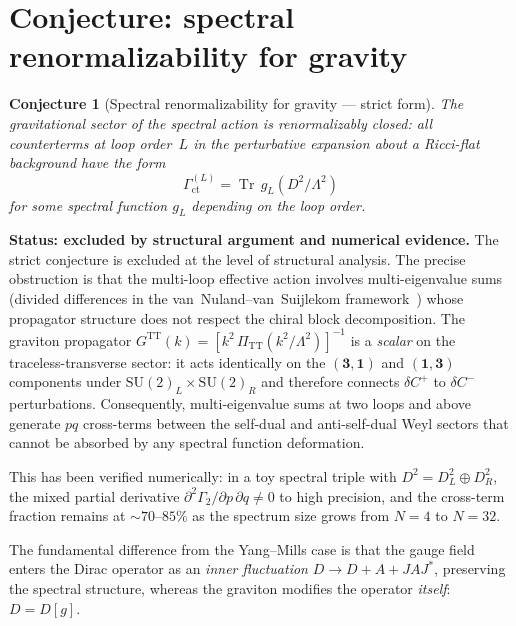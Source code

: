 \documentclass[12pt,a4paper]{article}
\newtheorem{conjecture}[theorem]{Conjecture}
\theoremstyle{definition}
\theoremstyle{remark}
\newcommand{\Tr}{\operatorname{Tr}}
\newcommand{\Lam}{\Lambda}
\begin{document}
\section{Conjecture: spectral renormalizability for gravity}
\label{sec:conjecture}

\begin{conjecture}[Spectral renormalizability for gravity --- strict form]
\label{conj:spectral}
The gravitational sector of the spectral action is \emph{renormalizably
closed}: all counterterms at loop order~$L$ in the perturbative expansion
about a Ricci-flat background have the form
\begin{equation}\label{eq:conj}
  \Gamma_{\mathrm{ct}}^{(L)} = \Tr\,g_L(D^2/\Lam^2)
\end{equation}
for some spectral function $g_L$ depending on the loop order.
\end{conjecture}

\noindent\textbf{Status: excluded by structural argument and numerical evidence.}
The strict conjecture is excluded at the level of structural analysis.  The precise
obstruction is that the multi-loop effective action involves multi-eigenvalue
sums (divided differences in the van~Nuland--van~Suijlekom
framework~\cite{vanNuland:2021}) whose propagator structure does not respect
the chiral block decomposition.  The graviton propagator
$G^{\mathrm{TT}}(k) = [k^2\,\Pi_{\mathrm{TT}}(k^2/\Lam^2)]^{-1}$
is a \emph{scalar} on the traceless-transverse sector: it acts identically
on the $(\mathbf{3}, \mathbf{1})$ and $(\mathbf{1}, \mathbf{3})$ components
under $\mathrm{SU}(2)_L \times \mathrm{SU}(2)_R$ and therefore connects
$\delta C^+$ to $\delta C^-$ perturbations.  Consequently, multi-eigenvalue
sums at two loops and above generate $pq$ cross-terms between the self-dual
and anti-self-dual Weyl sectors that cannot be absorbed by any spectral
function deformation.

This has been verified numerically: in a toy spectral triple with
$D^2 = D^2_L \oplus D^2_R$, the mixed partial derivative
$\partial^2\Gamma_2/\partial p\,\partial q \neq 0$ to high precision, and
the cross-term fraction remains at $\sim 70$--$85\%$ as the spectrum size
grows from $N = 4$ to $N = 32$.

The fundamental difference from the Yang--Mills case is that the gauge field
enters the Dirac operator as an \emph{inner fluctuation}
$D \to D + A + JAJ^*$, preserving the spectral structure, whereas the
graviton modifies the operator \emph{itself}: $D = D[g]$.
\end{document}
